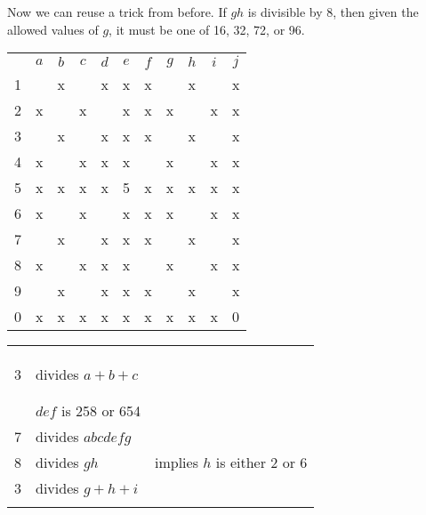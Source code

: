 Now we can reuse a trick from before.  If $gh$ is divisible by 8, then given the allowed values of $g$, it must be one of 16, 32, 72, or 96.
\begin{center}
\begin{tabular}{ccccccccccc}
			&	$a$	&	$b$	&	$c$	&	$d$	&	$e$	&	$f$	&	$g$	&	$h$	&	$i$	&	$j$	\\
	1		&		&	x	&		&	x	&	x	&	x	&		&	x	&		&	x	\\
	2		&	x	&		&	x	&		&	x	&	x	&	x	&		&	x	&	x	\\
	3		&		&	x	&		&	x	&	x	&	x	&		&	x	&		&	x	\\
	4		&	x	&		&	x	&	x	&	x	&		&	x	&		&	x	&	x	\\
	5		&	x	&	x	&	x	&	x	&	5	&	x	&	x	&	x	&	x	&	x	\\
	6		&	x	&		&	x	&		&	x	&	x	&	x	&		&	x	&	x	\\
	7		&		&	x	&		&	x	&	x	&	x	&		&	x	&		&	x	\\
	8		&	x	&		&	x	&	x	&	x	&		&	x	&		&	x	&	x	\\
	9		&		&	x	&		&	x	&	x	&	x	&		&	x	&		&	x	\\
	0		&	x	&	x	&	x	&	x	&	x	&	x	&	x	&	x	&	x	&	0	\\
\end{tabular}
\hspace{1cm}\vline\hspace{1cm}
\begin{tabular}{rll}
	& 		\\
	& 		\\
	& 		\\
	3	&	divides $a+b+c$		\\
	& 		\\
	&		\\
	&	$def$ is 258 or 654		\\
	7	&	divides $abcdefg$	\\
	8	&	divides $gh$		& implies $h$ is either 2 or 6 \\
	3	&	divides $g+h+i$		\\
		&	
\end{tabular}
\end{center}


